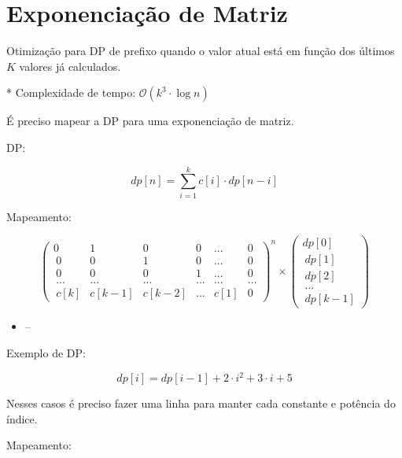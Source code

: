 \documentclass[10pt, a4paper, oneside]{book}
\begin{document}
\section{Exponenciação de Matriz}


Otimização para DP de prefixo quando o valor atual está em função dos últimos $K$ valores já calculados.   



* Complexidade de tempo: $\mathcal{O}(k^3 \cdot \log n)$



É preciso mapear a DP para uma exponenciação de matriz.



\textbf{} 


DP:   



$$ dp[n] = \sum_{i=1}^{k} c[i] \cdot dp[n - i] $$ 



Mapeamento:   



$$ \begin{pmatrix} 0&1&0&0&...&0 \\\ 0&0&1&0&...&0 \\\ 0&0&0&1&...&0 \\\ ...&...&...&...&...&... \\\ c[k]&c[k-1]&c[k-2]&...&c[1]&0 \end{pmatrix}^n \times \begin{pmatrix} dp[0] \\\ dp[1] \\\ dp[2] \\\ ... \\\ dp[k-1] \end{pmatrix} $$



\begin{itemize}
\item --
\end{itemize}

\textbf{} 


Exemplo de DP:   



$$ dp[i] = dp[i-1] + 2 \cdot i^2 + 3 \cdot i + 5 $$



Nesses casos é preciso fazer uma linha para manter cada constante e potência do índice.



Mapeamento:
\end{document}
